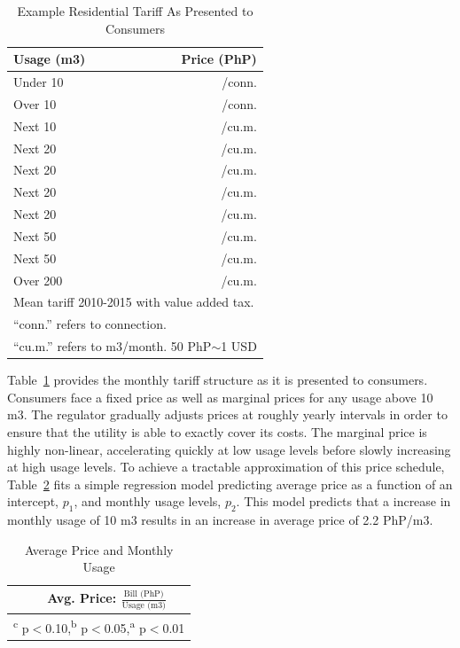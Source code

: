 \documentclass[12pt]{article}
\begin{document}
\begin{table}[H]
\centering
\caption{Example Residential Tariff As Presented to Consumers}\label{table:tarifftrue}
\vspace{-2mm}
\begin{tabular}{l*{1}{r}}
\toprule
Usage (m3) & Price (PhP) \\
\midrule
Under  10    &   /conn. \\
Over  10     &   /conn. \\
Next   10    &   /cu.m. \\
Next    20   &   /cu.m. \\
Next   20    &   /cu.m. \\
Next    20   &   /cu.m. \\
Next    20   &   /cu.m. \\
Next    50   &   /cu.m. \\
Next   50    &   /cu.m. \\
Over  200    &   /cu.m. \\
\bottomrule
\multicolumn{2}{l}{\scriptsize Mean tariff 2010-2015 with value added tax. }\\[-.5em]
\multicolumn{2}{l}{\scriptsize ``conn.'' refers to connection. }\\[-.5em]
\multicolumn{2}{l}{\scriptsize ``cu.m.'' refers to m3/month.  50 PhP$\sim$1 USD }
\end{tabular}
\end{table}

Table~\ref{table:tarifftrue} provides the monthly tariff structure as it is presented to consumers.  Consumers face a fixed price as well as marginal prices for any usage above 10 m3.  The regulator gradually adjusts prices at roughly yearly intervals in order to ensure that the utility is able to exactly cover its costs.  The marginal price is highly non-linear, accelerating quickly at low usage levels before slowly increasing at high usage levels.  To achieve a tractable approximation of this price schedule, Table~\ref{table:tcd_predict} fits a simple regression model predicting average price as a function of an intercept, $p_1$, and monthly usage levels, $p_2$.  This model predicts that a increase in monthly usage of 10 m3 results in an increase in average price of 2.2 PhP/m3.  

\begin{table}[H]
\small
\centering
\caption{Average Price and Monthly Usage}\label{table:tcd_predict}
\vspace{-2mm}
\begin{tabular}{lc}
\toprule
& \small Avg. Price: $\frac{\text{Bill (PhP)}}{\text{Usage (m3)}}$    \\
\midrule 

\bottomrule
\multicolumn{2}{l}{\scriptsize \textsuperscript{c} p$<$0.10,\textsuperscript{b} p$<$0.05,\textsuperscript{a} p$<$0.01 }
\end{tabular}
\end{table}
\end{document}
